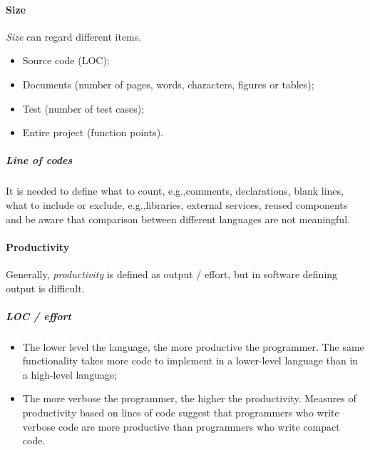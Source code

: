 \paragraph{Size}
\emph{Size} can regard different items.
\begin{itemize}
\item Source code (LOC);
\item Documents (number of pages, words, characters, figures or tables);
\item Test (number of test cases);
\item Entire project (function points).
\end{itemize}

\subparagraph{Line of codes}
It is needed to define what to count, e.g.,\@ comments, declarations, blank lines, what to include or exclude, e.g.,\@ libraries, external services, reused components and be aware that comparison between different languages are not meaningful.

\paragraph{Productivity}
Generally, \emph{productivity} is defined as output / effort, but in software defining output is difficult.

\subparagraph{LOC / effort}
\begin{itemize}
\item The lower level the language, the more productive the programmer. The same functionality takes more code to implement in a lower-level language than in a high-level language;
\item The more verbose the programmer, the higher the productivity. Measures of productivity based on lines of code suggest that programmers who write verbose code are more productive than programmers who write compact code.
\end{itemize}